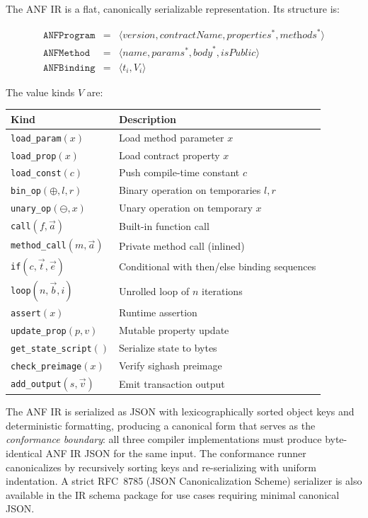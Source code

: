 \documentclass[11pt,a4paper]{article}
\begin{document}
The ANF IR is a flat, canonically serializable representation. Its structure
is:

\[
\begin{array}{rcl}
\texttt{ANFProgram} &=& \langle \textit{version}, \textit{contractName}, \textit{properties}^*, \textit{methods}^* \rangle \\
\texttt{ANFMethod} &=& \langle \textit{name}, \textit{params}^*, \textit{body}^*, \textit{isPublic} \rangle \\
\texttt{ANFBinding} &=& \langle t_i, V_i \rangle
\end{array}
\]

The value kinds $V$ are:

\begin{center}
\small
\begin{tabular}{@{}ll@{}}
\toprule
\textbf{Kind} & \textbf{Description} \\
\midrule
\texttt{load\_param}$(x)$ & Load method parameter $x$ \\
\texttt{load\_prop}$(x)$ & Load contract property $x$ \\
\texttt{load\_const}$(c)$ & Push compile-time constant $c$ \\
\texttt{bin\_op}$(\oplus, l, r)$ & Binary operation on temporaries $l, r$ \\
\texttt{unary\_op}$(\ominus, x)$ & Unary operation on temporary $x$ \\
\texttt{call}$(f, \vec{a})$ & Built-in function call \\
\texttt{method\_call}$(m, \vec{a})$ & Private method call (inlined) \\
\texttt{if}$(c, \vec{t}, \vec{e})$ & Conditional with then/else binding sequences \\
\texttt{loop}$(n, \vec{b}, i)$ & Unrolled loop of $n$ iterations \\
\texttt{assert}$(x)$ & Runtime assertion \\
\texttt{update\_prop}$(p, v)$ & Mutable property update \\
\texttt{get\_state\_script}$ ()$ & Serialize state to bytes \\
\texttt{check\_preimage}$(x)$ & Verify sighash preimage \\
\texttt{add\_output}$(s, \vec{v})$ & Emit transaction output \\
\bottomrule
\end{tabular}
\end{center}

The ANF IR is serialized as JSON with lexicographically sorted object keys
and deterministic formatting, producing a canonical form that serves as the
\emph{conformance boundary}: all three compiler implementations must produce
byte-identical ANF IR JSON for the same input. The conformance runner
canonicalizes by recursively sorting keys and re-serializing with uniform
indentation. A strict RFC~8785 (JSON Canonicalization Scheme) serializer
is also available in the IR schema package for use cases requiring minimal
canonical JSON.
\end{document}
